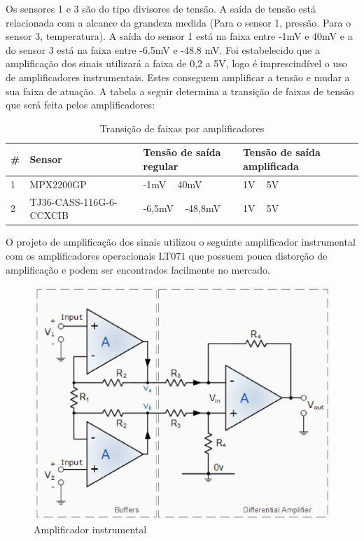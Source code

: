 Os sensores 1 e 3 são do tipo divisores de tensão. A saída de tensão está relacionada com a alcance da grandeza medida (Para o sensor 1, pressão. Para o sensor 3, temperatura). A saída do sensor 1 está na faixa entre -1mV e 40mV e a do sensor 3 está na faixa entre -6.5mV e -48.8 mV.
Foi estabelecido que a amplificação dos sinais utilizará a faixa de 0,2 a 5V, logo é imprescindível o uso de amplificadores instrumentais. Estes conseguem amplificar a tensão e mudar a sua faixa de atuação. A tabela a seguir determina a transição de faixas de tensão que será feita pelos amplificadores:

\begin{table}[]
    \centering
    \begin{tabular}{|p{3cm}|p{5cm}|p{3cm}|p{3cm}|}
    \hline
    \textbf{\#} & \textbf{Sensor}    & \textbf{Tensão de saída regular} & \textbf{Tensão de saída amplificada} \\ \hline
    1      & MPX2200GP & -1mV ~ 40mV   & 1V ~ 5V  \\ \hline
    2 & TJ36-CASS-116G-6-CCXCIB & -6,5mV ~ -48,8mV & 1V ~ 5V \\ \hline
    \end{tabular}
    \caption{Transição de faixas por amplificadores}
    \end{table}

O projeto de amplificação dos sinais utilizou o seguinte amplificador instrumental com os amplificadores operacionais LT071 que possuem pouca distorção de amplificação e podem ser encontrados facilmente no mercado.

\begin{figure}[!h]                  
	\centering                          
	\includegraphics[scale=0.5]{figuras/IMG1.eps}
	\caption{ Amplificador instrumental}             
\end{figure}

